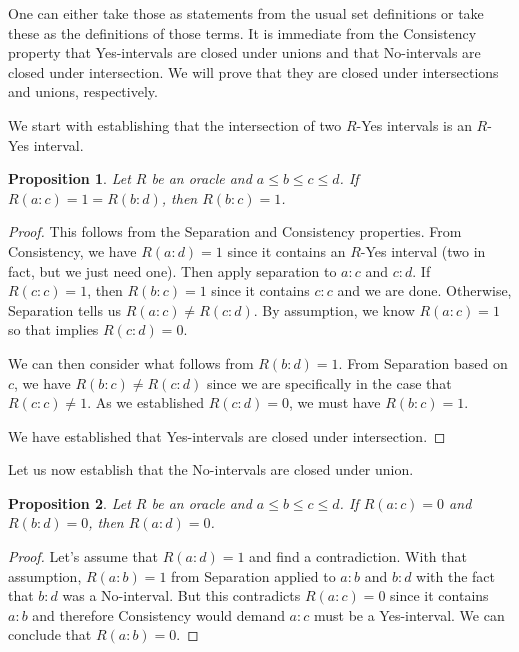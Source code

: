 \documentclass[12pt]{article}
\newtheorem{proposition}{Proposition}
\theoremstyle{remark}
\begin{document}
One can either take those as statements from the usual set definitions or take these as the definitions of those terms. It is immediate from the Consistency property that Yes-intervals are closed under unions and that No-intervals are closed under intersection. We will prove that they are closed under intersections and unions, respectively. 

We start with establishing that the intersection of two $R$-Yes intervals is an $R$-Yes interval.

\begin{proposition}
Let $R$ be an oracle and $a \leq b \leq c \leq d$. If $R(a:c) = 1 = R(b:d)$, then $R(b:c) = 1$.
\end{proposition}

\begin{proof}
  
  This follows from the Separation and Consistency properties. From Consistency, we have $R(a:d) = 1$ since it contains an $R$-Yes interval (two in fact, but we just need one). Then apply separation to $a:c$ and $c:d$. If $R(c:c) = 1$, then $R(b:c) = 1$ since it contains $c:c$ and we are done. Otherwise, Separation tells us $R(a:c) \neq R(c:d)$. By assumption, we know $R(a:c) = 1$ so that implies $R(c:d) = 0$. 
  
  We can then consider what follows from $R(b:d) = 1$.  From Separation based on $c$, we have $R(b:c) \neq R(c:d)$ since we are specifically in the case that $R(c:c) \neq 1$. As we established $R(c:d) = 0$, we must have $R(b:c) = 1$.
  
  We have established that Yes-intervals are closed under intersection. 
\end{proof}

Let us now establish that the No-intervals are closed under union. 

\begin{proposition}
Let $R$ be an oracle and $a \leq b \leq c \leq d$.  If $R(a:c) = 0$ and $R(b:d) = 0$, then $R(a:d) = 0$. 
\end{proposition}

\begin{proof}
    Let's assume that $R(a:d) = 1$ and find a contradiction. With that assumption, $R(a:b) = 1$ from Separation applied to $a:b$ and $b:d$ with the fact that $b:d$ was a No-interval. But this contradicts $R(a:c)= 0$ since it contains $a:b$ and therefore Consistency would demand $a:c$ must be a Yes-interval. We can conclude that $R(a:b) =0$.
\end{proof}
\end{document}
